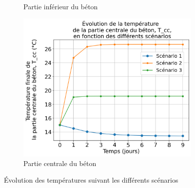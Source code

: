 \documentclass[12pt]{article}
\begin{document}
\begin{figure}
\begin{subfigure}{0.48\textwidth}
                \caption{Partie inférieur du béton} 
                \label{fig:Tc2}
            \end{subfigure}
            \begin{subfigure}{0.9\textwidth}
                \centering
                \includegraphics[width=1\linewidth]{Rapport/figures/T_cc.png}
                \caption{Partie centrale du béton} 
                \label{fig:Tcc}
            \end{subfigure}
            \label{fig:Scenario}
            \caption{Évolution des températures suivant les différents scénarios}
        \end{figure}
        
        
        


        
\newpage

\end{document}
